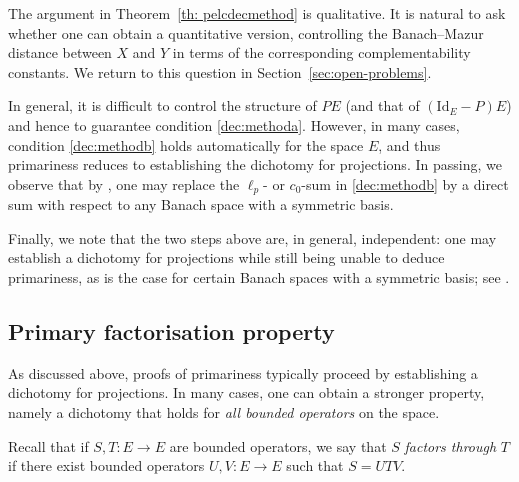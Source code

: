 \documentclass[11pt]{amsart}
\theoremstyle{plain}
\theoremstyle{definition}
\numberwithin{equation}{section}
\newcommand{\Id}{\mathrm{Id}}
\begin{document}
The argument in Theorem~\ref{th: pelcdecmethod} is qualitative. It is natural to ask whether one can obtain a quantitative version, controlling the Banach--Mazur distance between $X$ and $Y$ in terms of the corresponding complementability constants. We return to this question in Section~\ref{sec:open-problems}.

In general, it is difficult to control the structure of $PE$ (and that of $(\Id_E - P)E$) and hence to guarantee condition \ref{dec:methoda}. However, in many cases, condition \ref{dec:methodb} holds automatically for the space $E$, and thus primariness reduces to establishing the dichotomy for projections. In passing, we observe that by \cite[Proposition 1]{CKL1977}, one may replace the $\ell_p$- or $c_0$-sum in \ref{dec:methodb} by a direct sum with respect to any Banach space with a symmetric basis.

Finally, we note that the two steps above are, in general, independent: one may establish a dichotomy for projections while still being unable to deduce primariness, as is the case for certain Banach spaces with a symmetric basis; see \cite{CasazzaLin1974}.

\subsection{Primary factorisation property}

As discussed above, proofs of primariness typically proceed by establishing a dichotomy for projections. In many cases, one can obtain a stronger property, namely a dichotomy that holds for \emph{all bounded operators} on the space.

Recall that if $S, T \colon E \to E$ are bounded operators, we say that $S$ \emph{factors through} $T$ if there exist bounded operators $U, V \colon E \to E$ such that $S = U T V$.
\end{document}
